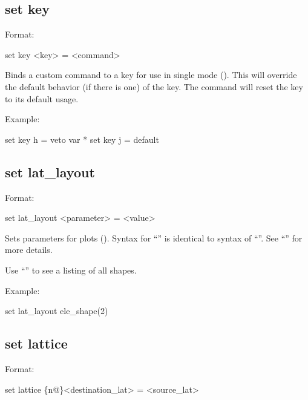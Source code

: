 {{\subsection{set key}
\label{s:set.key}

Format:
\begin{example}
  set key <key> = <command>
\end{example}

Binds a custom command to a key for use in single mode ().  This will override the
default behavior (if there is one) of the key.  The command  will reset the key to its
default usage.

Example:
\begin{example}
  set key h = veto var *
  set key j = default
\end{example}



\subsection{set lat_layout}
\label{s:set.lat.layout}

Format:
\begin{example}
  set lat_layout <parameter> = <value>
\end{example}

Sets parameters for  plots ().  Syntax for ``'' is
identical to syntax of ``''.  See ``'' for more details.

Use ``'' to see a listing of all shapes. 

Example:
\begin{example}
  set lat_layout ele_shape(2)%
\end{example}


\subsection{set lattice}
\label{s:set.lattice}

Format:
\begin{example}
  set lattice \{n@\}<destination_lat> = <source_lat>
\end{example}

}}
